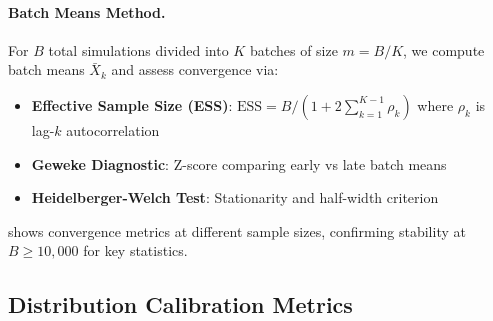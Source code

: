 \paragraph{Batch Means Method.}
For $B$ total simulations divided into $K$ batches of size $m = B/K$, we compute batch means $\bar{X}_k$ and assess convergence via:
\begin{itemize}
  \item \textbf{Effective Sample Size (ESS)}: $\text{ESS} = B / (1 + 2\sum_{k=1}^{K-1} \rho_k)$ where $\rho_k$ is lag-$k$ autocorrelation
  \item \textbf{Geweke Diagnostic}: Z-score comparing early vs late batch means
  \item \textbf{Heidelberger-Welch Test}: Stationarity and half-width criterion
\end{itemize}

 shows convergence metrics at different sample sizes, confirming stability at $B \geq 10,000$ for key statistics.


\subsection{Distribution Calibration Metrics}

